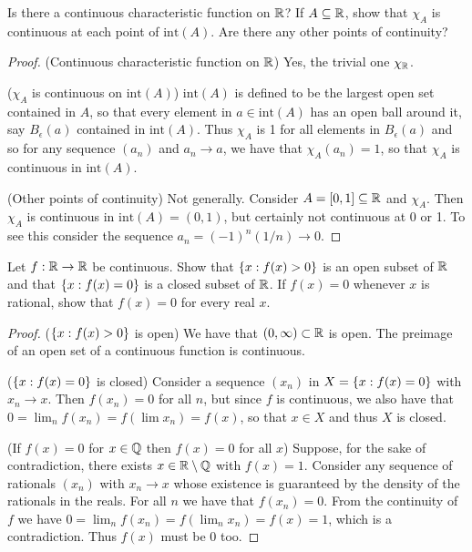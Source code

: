 \begin{exercise}{5}
Is there a continuous characteristic function on $\mathbb{R}$?
If $A\subseteq\mathbb{R}$, show that $\chi_A$ is continuous at each point of $\text{int}(A)$.
Are there any other points of continuity?
\end{exercise}
\begin{proof}
(Continuous characteristic function on $\mathbb{R}$)
Yes, the trivial one $\chi_{\mathbb{R}}$.

($\chi_A$ is continuous on $\text{int}(A)$)
$\text{int}(A)$ is defined to be the largest open set contained in $A$, so that every element in $a\in\text{int}(A)$ has an open ball around it, say $B_\epsilon(a)$ contained in $\text{int}(A)$.
Thus $\chi_A$ is 1 for all elements in $B_\epsilon(a)$ and so for any sequence $(a_n)$ and $a_n\to a$, we have that $\chi_A(a_n)=1$, so that $\chi_A$ is continuous in $\text{int}(A)$.

(Other points of continuity)
Not generally.
Consider $A=[0,1]\subseteq\mathbb{R}$ and $\chi_A$.
Then $\chi_A$ is continuous in $\text{int}(A)=(0,1)$, but certainly not continuous at 0 or 1.
To see this consider the sequence $a_n=(-1)^n(1/n)\to 0$.
\end{proof} 

\begin{exercise}{6}
Let $f:\mathbb{R}\to\mathbb{R}$ be continuous.
Show that $\{x:f(x)>0\}$ is an open subset of $\mathbb{R}$ and that $\{x:f(x)=0\}$ is a closed subset of $\mathbb{R}$.
If $f(x)=0$ whenever $x$ is rational, show that $f(x)=0$ for every real $x$.
\end{exercise}
\begin{proof}
($\{x:f(x)>0\}$ is open)
We have that $(0,\infty)\subset\mathbb{R}$ is open.
The preimage of an open set of a continuous function is continuous.

($\{x:f(x)=0\}$ is closed)
Consider a sequence $(x_n)$ in $X=\{x:f(x)=0\}$ with $x_n\to x$.
Then $f(x_n)=0$ for all $n$, but since $f$ is continuous, we also have that $0=\lim_nf(x_n) =f(\lim x_n)=f(x)$, so that $x\in X$ and thus $X$ is closed.

(If $f(x)=0$ for $x\in\mathbb{Q}$ then $f(x)=0$ for all $x$)
Suppose, for the sake of contradiction, there exists $x\in\mathbb{R}\setminus\mathbb{Q}$ with $f(x)=1$.
Consider any sequence of rationals $(x_n)$ with $x_n\to x$ whose existence is guaranteed by the density of the rationals in the reals.
For all $n$ we have that $f(x_n)=0$.
From the continuity of $f$ we have $0 =\lim_n f(x_n) =f(\lim_n x_n) =f(x) =1$, which is a contradiction.
Thus $f(x)$ must be 0 too.
\end{proof} 

